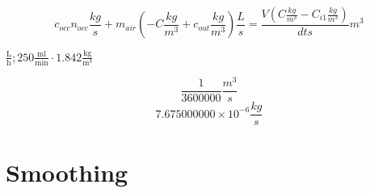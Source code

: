 \documentclass{article}
\begin{document}
\begin{dmath}\label{(1.2.5)}
c_{\mathit{occ}} n_{\mathit{occ}} {\left.\frac{\mathit{kg}}{s}\right.}+m_{\mathit{air}} \left(-C {\left.\frac{\mathit{kg}}{m^{3}}\right.}+c_{\mathit{out}} {\left.\frac{\mathit{kg}}{m^{3}}\right.}\right) {\left.\frac{L}{s}\right.}=\frac{V \left(C {\left.\frac{\mathit{kg}}{m^{3}}\right.}-C_{\mathit{i1}} {\left.\frac{\mathit{kg}}{m^{3}}\right.}\right)}{\mathit{dt} {\left.s \right.}} {\left.m^{3}\right.}
\end{dmath}
\begin{Maple Normal}
{$ \displaystyle {\left.\frac{\mathrm{L}}{\mathrm{h}}\right.};250{\left.\frac{\mathrm{ml}}{\min}\right.}\cdot  1.842{\left.\frac{\mathrm{kg}}{\mathrm{m}^{3}}\right.} $}
\end{Maple Normal}
\begin{dmath*}
\frac{1}{3600000} {\left.\frac{m^{3}}{s}\right.}
\end{dmath*}
\vspace{-\bigskipamount}
\begin{dmath}\label{(1.2.6)}
 7.675000000\times 10^{-6} {\left.\frac{\mathit{kg}}{s}\right.}
\end{dmath}
\begin{Maple Normal}

\end{Maple Normal}
\begin{Maple Normal}

\end{Maple Normal}
\section{\textbf{Smoothing}}
\begin{Maple Normal}

\end{Maple Normal}
\begin{Maple Normal}

\end{Maple Normal}
\end{document}

